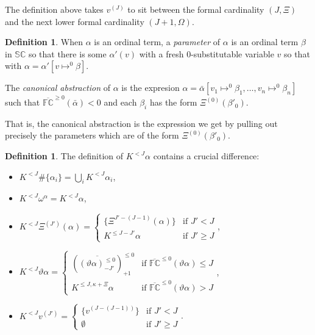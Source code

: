 \documentclass[11pt]{amsart}
\theoremstyle{definition}
\newtheorem{definition}[theorem]{Definition}
\begin{document}
The definition above takes $v^{(J)}$ to sit between the formal cardinality $(J,\Xi)$ and the next lower formal cardinality $(J+1,\Omega)$.


\begin{definition}
When $\alpha$ is an ordinal term, a \emph{parameter} of $\alpha$ is an ordinal term $\beta$ in $\mathbb{SC}$ so that there is some $\alpha'(v)$ with a fresh $0$-substitutable variable $v$ so that with $\alpha=\alpha'[v\mapsto^0\beta]$.

  The \emph{canonical abstraction} of $\alpha$ is the expresion $\alpha=\bar\alpha[v_1\mapsto^0\beta_1,\ldots,v_n\mapsto^0\beta_n]$ such that $\overline{\mathbb{FC}}^{\geq 0}(\bar\alpha)<0$ and each $\beta_i$ has the form $\Xi^{(0)}(\beta'_0)$.
\end{definition}
That is, the canonical abstraction is the expression we get by pulling out precisely the parameters which are of the form $\Xi^{(0)}(\beta'_0)$.
  
\begin{definition}
The definition of $K^{< J}\alpha$ contains a crucial difference:
  \begin{itemize}
  \item $K^{< J}\#\{\alpha_i\}=\bigcup_i K^{< J}\alpha_i$,
  \item $K^{< J}\omega^\alpha=K^{< J}\alpha$,
  \item $K^{< J}\Xi^{(J')}(\alpha)=\left\{\begin{array}{ll}
                                          \{\Xi^{J'-(J-1)}(\alpha)\}&\text{if }J'<J\\
                                          K^{\leq J-J'}\alpha&\text{if }J'\geq J
                                        \end{array}\right.$,
  \item $K^{< J}\vartheta\alpha=
    \left\{\begin{array}{ll}
             \left(\overline{(\vartheta\alpha)^{\leq 0}_{-J'}}\right)^{\leq 0}_{+1}&\text{if }\overline{\mathbb{FC}}^{\leq 0}(\vartheta\alpha)\leq J\\
             K^{\leq J,\kappa+\Xi}\alpha&\text{if }\overline{\mathbb{FC}}^{\leq 0}(\vartheta\alpha)>J
           \end{array}\right.$,
       \item $K^{< J} v^{(J')}=\left\{\begin{array}{ll}\{v^{(J-(J-1))}\}&\text{if }J'<J\\
                                                         \emptyset&\text{if }J'\geq J\end{array}\right.$.
  \end{itemize}
\end{definition}
\end{document}
